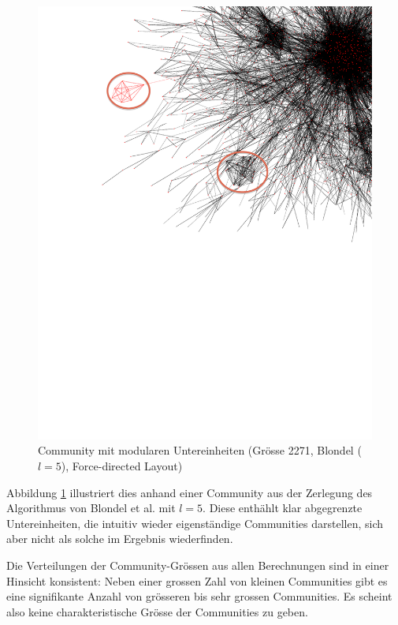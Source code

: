 \begin{figure}[ht!]
  \centering
  \includegraphics[scale=0.7]{images/blondel-l5-com-c3a5eaab680984b123037897b0be74bf-edit.pdf}
  \caption{Community mit modularen Untereinheiten (Gr\"osse 2271,
    Blondel ($l=5$), Force-directed Layout)}
  \label{fig:large-modular}
\end{figure}

Abbildung \ref{fig:large-modular} illustriert dies anhand einer
Community aus der Zerlegung des Algorithmus von Blondel et al. mit
$l=5$. Diese enth\"ahlt klar abgegrenzte Untereinheiten, die intuitiv
wieder eigenst\"andige Communities darstellen, sich aber nicht als
solche im Ergebnis wiederfinden.

Die Verteilungen der Community-Gr\"ossen aus allen Berechnungen sind
in einer Hinsicht konsistent: Neben einer grossen Zahl von kleinen
Communities gibt es eine signifikante Anzahl von gr\"osseren bis sehr
grossen Communities. Es scheint also keine charakteristische Gr\"osse
der Communities zu geben.

